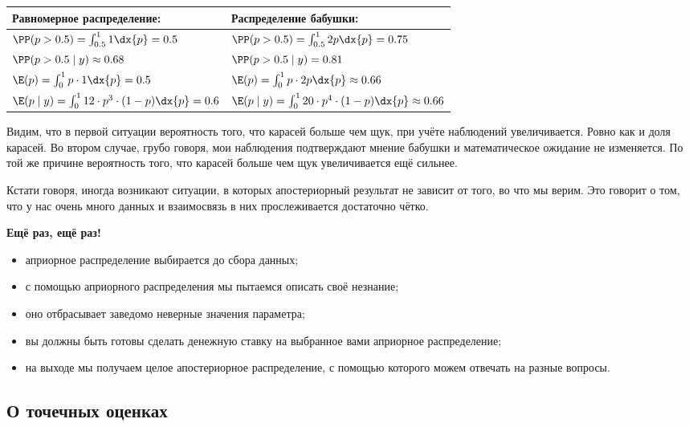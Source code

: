 \begin{table}[H]
\begin{tabularx}{\textwidth}{@{}XX@{}}
\toprule	
Равномерное распределение: & Распределение бабушки: \\
\midrule
$ \PP( p > 0.5 ) = \int_{0.5}^1 1 \dx{p} = 0.5 $  &   $ \PP( p > 0.5 ) = \int_{0.5}^1 2p \dx{p} = 0.75 $ \\
$\PP( p > 0.5 \mid y) \approx 0.68  $& $\PP( p > 0.5 \mid y) =  0.81 $  \\
$\E(p) = \int_0^1 p \cdot 1 \dx{p} = 0.5 $ & $ \E(p) = \int_0^1 p \cdot 2p \dx{p}  \approx 0.66 $  \\
$\E(p \mid y) = \int_0^1 12 \cdot p^3 \cdot (1-p) \dx{p} = 0.6$ & $\E(p \mid y) = \int_0^1 20  \cdot p^4 \cdot (1-p) \dx{p} \approx 0.66$ \\
\bottomrule
\end{tabularx}
\end{table}


Видим, что в первой ситуации вероятность того, что карасей больше чем щук, при учёте наблюдений увеличивается. Ровно как и доля карасей. Во втором случае, грубо говоря,  мои наблюдения подтверждают мнение бабушки и математическое ожидание не изменяется. По той же причине вероятность того, что карасей больше чем щук увеличивается ещё сильнее. 

Кстати говоря, иногда возникают ситуации, в которых апостериорный результат не зависит от того, во что мы верим. Это говорит о том, что у нас очень много данных и взаимосвязь в них прослеживается достаточно чётко. 

\textbf{Ещё раз, ещё раз!} 

\begin{itemize}
\item  априорное распределение выбирается до сбора данных;
\item  с помощью априорного распределения мы пытаемся описать своё незнание;
\item  оно отбрасывает заведомо неверные значения параметра;
\item  вы должны быть готовы сделать денежную ставку на выбранное вами априорное распределение;
\item  на выходе мы получаем целое апостериорное распределение, с помощью которого можем отвечать на разные вопросы.
\end{itemize}

\subsection*{О точечных оценках} 

